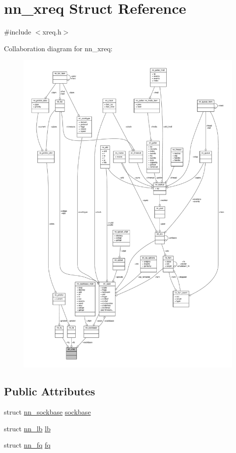 \hypertarget{structnn__xreq}{}\section{nn\+\_\+xreq Struct Reference}
\label{structnn__xreq}


{\ttfamily \#include $<$xreq.\+h$>$}



Collaboration diagram for nn\+\_\+xreq\+:\nopagebreak
\begin{figure}[H]
\begin{center}
\leavevmode
\includegraphics[width=350pt]{structnn__xreq__coll__graph}
\end{center}
\end{figure}
\subsection*{Public Attributes}
\begin{DoxyCompactItemize}
\item 
struct \hyperlink{structnn__sockbase}{nn\+\_\+sockbase} \hyperlink{structnn__xreq_a788ba048cefed592907ffadb3d7e7a96}{sockbase}
\item 
struct \hyperlink{structnn__lb}{nn\+\_\+lb} \hyperlink{structnn__xreq_a5815e000462e4c1fd010e6fb6fec71bb}{lb}
\item 
struct \hyperlink{structnn__fq}{nn\+\_\+fq} \hyperlink{structnn__xreq_a2081c86c86e3b6e0d40ae050a81fa07d}{fq}
\end{DoxyCompactItemize}


